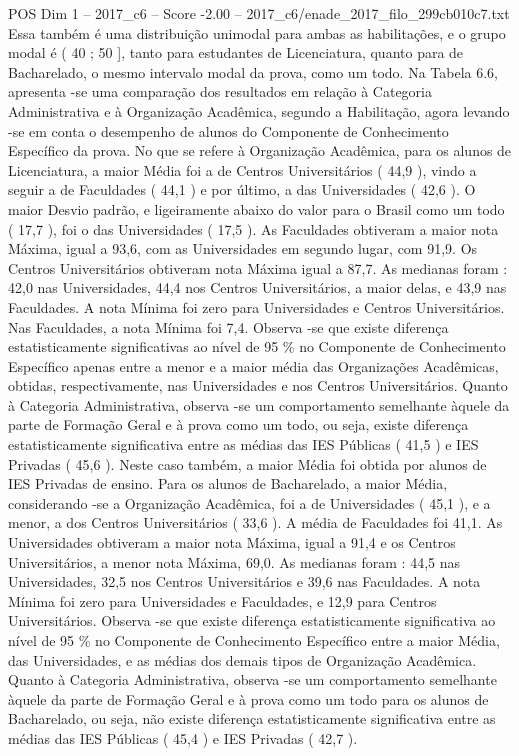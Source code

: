 \begin{textsample}{POS Dim 1 – 2017\_c6 – Score -2.00 – 2017\_c6/enade\_2017\_filo\_299cb010c7.txt}
Essa também é uma distribuição unimodal para ambas as habilitações, e o grupo modal é ( 40 ; 50 ], tanto para estudantes de Licenciatura, quanto para de Bacharelado, o mesmo intervalo modal da prova, como um todo.
Na Tabela 6.6, apresenta -se uma comparação dos resultados em relação à Categoria Administrativa e à Organização Acadêmica, segundo a Habilitação, agora levando -se em conta o desempenho de alunos do Componente de Conhecimento Específico da prova.
No que se refere à Organização Acadêmica, para os alunos de Licenciatura, a maior Média foi a de Centros Universitários ( 44,9 ), vindo a seguir a de Faculdades ( 44,1 ) e por último, a das Universidades ( 42,6 ).
O maior Desvio padrão, e ligeiramente abaixo do valor para o Brasil como um todo ( 17,7 ), foi o das Universidades ( 17,5 ).
As Faculdades obtiveram a maior nota Máxima, igual a 93,6, com as Universidades em segundo lugar, com 91,9.
Os Centros Universitários obtiveram nota Máxima igual a 87,7.
As medianas foram : 42,0 nas Universidades, 44,4 nos Centros Universitários, a maior delas, e 43,9 nas Faculdades.
A nota Mínima foi zero para Universidades e Centros Universitários.
Nas Faculdades, a nota Mínima foi 7,4.
Observa -se que existe diferença estatisticamente significativas ao nível de 95 \% no Componente de Conhecimento Específico apenas entre a menor e a maior média das Organizações Acadêmicas, obtidas, respectivamente, nas Universidades e nos Centros Universitários.
Quanto à Categoria Administrativa, observa -se um comportamento semelhante àquele da parte de Formação Geral e à prova como um todo, ou seja, existe diferença estatisticamente significativa entre as médias das IES Públicas ( 41,5 ) e IES Privadas ( 45,6 ).
Neste caso também, a maior Média foi obtida por alunos de IES Privadas de ensino.
Para os alunos de Bacharelado, a maior Média, considerando -se a Organização Acadêmica, foi a de Universidades ( 45,1 ), e a menor, a dos Centros Universitários ( 33,6 ).
A média de Faculdades foi 41,1.
As Universidades obtiveram a maior nota Máxima, igual a 91,4 e os Centros Universitários, a menor nota Máxima, 69,0.
As medianas foram : 44,5 nas Universidades, 32,5 nos Centros Universitários e 39,6 nas Faculdades.
A nota Mínima foi zero para Universidades e Faculdades, e 12,9 para Centros Universitários.
Observa -se que existe diferença estatisticamente significativa ao nível de 95 \% no Componente de Conhecimento Específico entre a maior Média, das Universidades, e as médias dos demais tipos de Organização Acadêmica.
Quanto à Categoria Administrativa, observa -se um comportamento semelhante àquele da parte de Formação Geral e à prova como um todo para os alunos de Bacharelado, ou seja, não existe diferença estatisticamente significativa entre as médias das IES Públicas ( 45,4 ) e IES Privadas ( 42,7 ).

\end{textsample}
